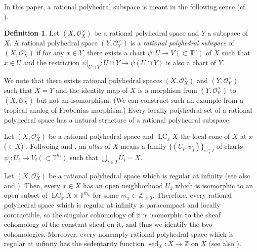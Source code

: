 \documentclass[a4paper,dvipdfmx,reqno,12pt]{amsart}
\theoremstyle{definition}
\newtheorem{definition}[theorem]{Definition}
\newcommand{\opn}[1]{\operatorname{#1}}
\numberwithin{equation}{section}
\begin{document}
In this paper, a rational polyhedral subspace is meant
in the following sense
(cf. \cite[Definition 2.14]{demedrano2023chern}).

\begin{definition}
Let 
$(X,\mathcal{O}_X^{\times})$ be a rational polyhedral space
and $Y$ a subspace of $X$.
A rational polyhedral space $(Y,\mathcal{O}_Y^{\times})$ is 
a \emph{rational polyhedral subspace} of
$(X,\mathcal{O}_X^{\times})$ if 
for any $x\in Y$, there exists a chart
$\psi \colon U \to V (\subset \mathbb{T}^{n})$
of $X$ \cite[Definition 2.2]{MR4637248}
such that $x\in U$ and the restriction
$\psi|_{U\cap Y}\colon U\cap Y\to 
\psi(U\cap Y)$ is also a chart of $Y$.
\end{definition}
We note that there exists rational polyhedral spaces
$(X,\mathcal{O}_X^{\times})$
and $(Y,\mathcal{O}_Y^{\times})$
such that $X=Y$ and the identity map of $X$ 
is a morphism from $(Y,\mathcal{O}_Y^{\times})$ to
$(X,\mathcal{O}_X^{\times})$ but not an isomorphism.
(We can construct such an example from a tropical analog of
Frobenius morphism.)
Every locally polyhedral set of a rational polyhedral space
\cite[Definition 2.4 (d)]{MR4637248} has a natural 
structure of a rational polyhedral subspace.

Let $(X,\mathcal{O}_X^{\times})$ be a rational polyhedral space
and $\opn{LC}_x X$ the local cone of $X$ at $x$ ($\in X$)
\cite[]{MR4637248}.
Follwoing \cite[Definition 7.1.8]{mikhalkin2018tropical} and 
\cite[Definition 2.3]{demedrano2023chern},
an \emph{atlas} of $X$ means a family 
$\{(U_i,\psi_i)\}_{i\in I}$ of charts 
$\psi_i\colon U_i\to V_i (\subset \mathbb{T}^{n_i})$
such that $\bigcup_{i\in I}U_i=X$.

Let $(X,\mathcal{O}_X^{\times})$ be
a rational polyhedral space which is regular at
infinity \cite[]{MR4637248}
(see also \cite[Definition 1.2]{MR3330789}
and \cite[Definition 7.2.4 and Corollary 7.2.11]{mikhalkin2018tropical}).
Then, every $x\in X$ has an open neighborhood $U_x$
which is isomorphic to an open subset of 
$\opn{LC}_x X\times \mathbb{T}^{m_x}$ for some
$m_x\in \mathbb{Z}_{\geq 0}$.
Therefore, every rational polyhedral space which
is regular at infinity is paracompact and
locally contractible,
so the singular cohomology
of it is isomorphic to the sheaf cohomology
of the constant sheaf on it, and thus we identify
the two cohomologies.
Moreover,
every nonempty
rational polyhedral space which is regular
at infinity has the sedentarity function
$\opn{sed}_X\colon X\to \mathbb{Z}$ on $X$
\cite[Definition 7.2.6]{mikhalkin2018tropical}
(see also \cite[Definition 2.4]{demedrano2023chern}).
\end{document}
